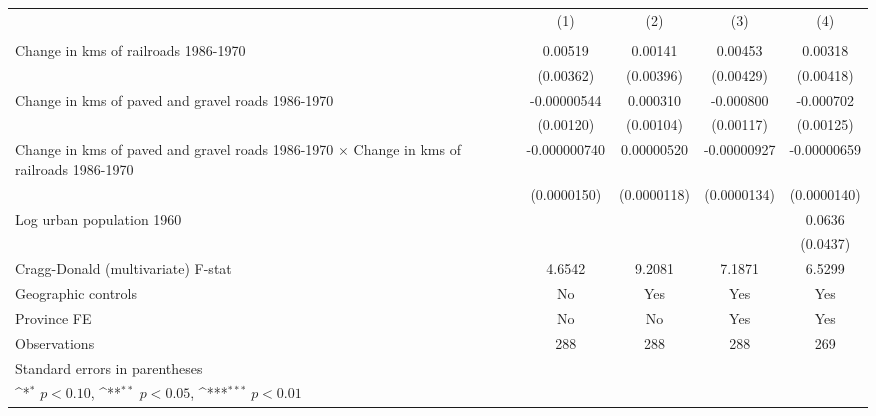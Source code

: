 {
\def\sym#1{\ifmmode^{#1}\else\(^{#1}\)\fi}
\begin{tabular}{l*{4}{c}}
\hline\hline
                &\multicolumn{1}{c}{(1)}&\multicolumn{1}{c}{(2)}&\multicolumn{1}{c}{(3)}&\multicolumn{1}{c}{(4)}\\
                &\multicolumn{1}{c}{}&\multicolumn{1}{c}{}&\multicolumn{1}{c}{}&\multicolumn{1}{c}{}\\
\hline
Change in kms of railroads 1986-1970&  0.00519         &  0.00141         &  0.00453         &  0.00318         \\
                &(0.00362)         &(0.00396)         &(0.00429)         &(0.00418)         \\
[1em]
Change in kms of paved and gravel roads 1986-1970&-0.00000544         & 0.000310         &-0.000800         &-0.000702         \\
                &(0.00120)         &(0.00104)         &(0.00117)         &(0.00125)         \\
[1em]
Change in kms of paved and gravel roads 1986-1970 $\times$ Change in kms of railroads 1986-1970&-0.000000740         &0.00000520         &-0.00000927         &-0.00000659         \\
                &(0.0000150)         &(0.0000118)         &(0.0000134)         &(0.0000140)         \\
[1em]
Log urban population 1960&                  &                  &                  &   0.0636         \\
                &                  &                  &                  & (0.0437)         \\
\hline
Cragg-Donald (multivariate) F-stat&   4.6542         &   9.2081         &   7.1871         &   6.5299         \\
Geographic controls&       No         &      Yes         &      Yes         &      Yes         \\
Province FE     &       No         &       No         &      Yes         &      Yes         \\
Observations    &      288         &      288         &      288         &      269         \\
\hline\hline
\multicolumn{5}{l}{\footnotesize Standard errors in parentheses}\\
\multicolumn{5}{l}{\footnotesize \sym{*} \(p<0.10\), \sym{**} \(p<0.05\), \sym{***} \(p<0.01\)}\\
\end{tabular}
}
